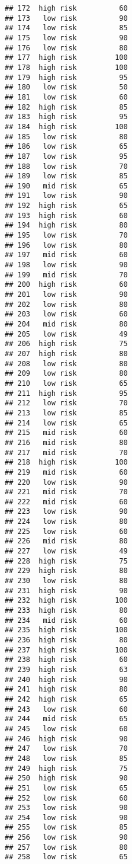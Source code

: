 \documentclass[
  ignorenonframetext,
]{beamer}
\begin{document}
\begin{frame}[fragile]
\begin{verbatim}
## 172  high risk          60
## 173   low risk          90
## 174   low risk          85
## 175   low risk          90
## 176   low risk          80
## 177  high risk         100
## 178  high risk         100
## 179  high risk          95
## 180   low risk          50
## 181   low risk          60
## 182  high risk          85
## 183  high risk          95
## 184  high risk         100
## 185   low risk          80
## 186   low risk          65
## 187   low risk          95
## 188   low risk          70
## 189   low risk          85
## 190   mid risk          65
## 191   low risk          90
## 192  high risk          65
## 193  high risk          60
## 194  high risk          80
## 195   low risk          70
## 196   low risk          80
## 197   mid risk          60
## 198   low risk          90
## 199   mid risk          70
## 200  high risk          60
## 201   low risk          90
## 202   low risk          80
## 203   low risk          60
## 204   mid risk          80
## 205   low risk          49
## 206  high risk          75
## 207  high risk          80
## 208   low risk          80
## 209   low risk          80
## 210   low risk          65
## 211  high risk          95
## 212   low risk          70
## 213   low risk          85
## 214   low risk          65
## 215   mid risk          60
## 216   mid risk          80
## 217   mid risk          70
## 218  high risk         100
## 219   mid risk          60
## 220   low risk          90
## 221   mid risk          70
## 222   mid risk          60
## 223   low risk          90
## 224   low risk          80
## 225   low risk          60
## 226   mid risk          80
## 227   low risk          49
## 228  high risk          75
## 229  high risk          80
## 230   low risk          80
## 231  high risk          90
## 232  high risk         100
## 233  high risk          80
## 234   mid risk          60
## 235  high risk         100
## 236  high risk          80
## 237  high risk         100
## 238  high risk          60
## 239  high risk          63
## 240  high risk          90
## 241  high risk          80
## 242  high risk          65
## 243   low risk          60
## 244   mid risk          65
## 245   low risk          60
## 246  high risk          90
## 247   low risk          70
## 248   low risk          85
## 249  high risk          75
## 250  high risk          90
## 251   low risk          65
## 252   low risk          60
## 253   low risk          90
## 254   low risk          90
## 255   low risk          85
## 256   low risk          90
## 257   low risk          80
## 258   low risk          65

\end{verbatim}
\end{frame}
\end{document}

